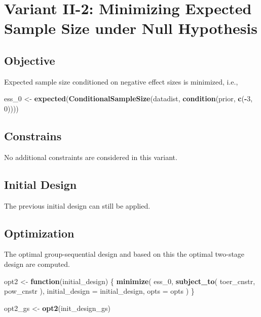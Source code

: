 \documentclass[]{book}
\newenvironment{Shaded}{\begin{snugshade}}{\end{snugshade}}
\newcommand{\ControlFlowTok}[1]{\textcolor[rgb]{0.13,0.29,0.53}{\textbf{#1}}}
\newcommand{\DataTypeTok}[1]{\textcolor[rgb]{0.13,0.29,0.53}{#1}}
\newcommand{\DecValTok}[1]{\textcolor[rgb]{0.00,0.00,0.81}{#1}}
\newcommand{\KeywordTok}[1]{\textcolor[rgb]{0.13,0.29,0.53}{\textbf{#1}}}
\newcommand{\NormalTok}[1]{#1}
\newcommand{\OperatorTok}[1]{\textcolor[rgb]{0.81,0.36,0.00}{\textbf{#1}}}
\newcommand{\StringTok}[1]{\textcolor[rgb]{0.31,0.60,0.02}{#1}}
\begin{document}
\hypertarget{variantII_2}{%
\section{Variant II-2: Minimizing Expected Sample Size under Null Hypothesis}\label{variantII_2}}

\hypertarget{objective-4}{%
\subsection{Objective}\label{objective-4}}

Expected sample size conditioned on negative effect sizes is minimized, i.e.,

\begin{Shaded}
\begin{Highlighting}[]
\NormalTok{ess_}\DecValTok{0}\NormalTok{ <-}\StringTok{ }\KeywordTok{expected}\NormalTok{(}\KeywordTok{ConditionalSampleSize}\NormalTok{(datadist, }\KeywordTok{condition}\NormalTok{(prior, }\KeywordTok{c}\NormalTok{(}\OperatorTok{-}\DecValTok{3}\NormalTok{, }\DecValTok{0}\NormalTok{))))}
\end{Highlighting}
\end{Shaded}

\hypertarget{constrains-4}{%
\subsection{Constrains}\label{constrains-4}}

No additional constraints are considered in this variant.

\hypertarget{initial-design-4}{%
\subsection{Initial Design}\label{initial-design-4}}

The previous initial design can still be applied.

\hypertarget{optimization-4}{%
\subsection{Optimization}\label{optimization-4}}

The optimal group-sequential design and based on this the
optimal two-stage design are computed.

\begin{Shaded}
\begin{Highlighting}[]
\NormalTok{opt2 <-}\StringTok{ }\ControlFlowTok{function}\NormalTok{(initial_design) \{}
    \KeywordTok{minimize}\NormalTok{(}
\NormalTok{        ess_}\DecValTok{0}\NormalTok{,}
        \KeywordTok{subject_to}\NormalTok{(}
\NormalTok{            toer_cnstr,}
\NormalTok{            pow_cnstr}
\NormalTok{        ),}
        \DataTypeTok{initial_design =}\NormalTok{ initial_design,}
        \DataTypeTok{opts =}\NormalTok{ opts}
\NormalTok{    )}
\NormalTok{\}}

\NormalTok{opt2_gs <-}\StringTok{ }\KeywordTok{opt2}\NormalTok{(init_design_gs)}
\end{Highlighting}
\end{Shaded}
\end{document}
